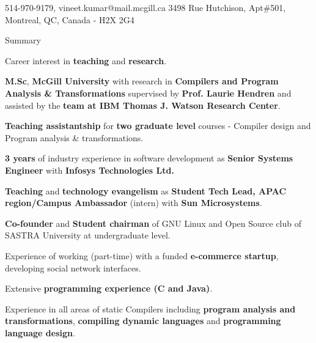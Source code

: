 \documentclass{resume} %
\begin{document}
\begin{hSubsection}{514-970-9179, vineet.kumar@mail.mcgill.ca}
{%
}{3498 Rue Hutchison, Apt\#501, Montreal, QC, Canada - H2X 2G4}
\end{hSubsection}



\begin{rSection}{Summary}
\smallskip
\begin{lSubsection}
 \item Career interest in \textbf{teaching} and \textbf{research}.
 \item \textbf{M.Sc}, \textbf{McGill University} with research in \textbf{Compilers and Program Analysis \& Transformations} supervised by \textbf{Prof. Laurie Hendren} and assisted by the \textbf{\xten team at IBM Thomas J. Watson Research Center}.
 \item \textbf {Teaching assistantship} for \textbf{two graduate level} courses - Compiler design and  Program analysis \& transformations.
 \item \textbf{3 years} of industry experience in software development as \textbf{Senior Systems Engineer} with \textbf{Infosys Technologies Ltd.}
 \item \textbf{Teaching} and \textbf{technology evangelism} as \textbf{Student Tech Lead, APAC region/Campus Ambassador} (intern) with \textbf{Sun Microsystems}.
 \item \textbf{Co-founder} and \textbf{Student chairman} of GNU Linux and Open Source club of SASTRA University at undergraduate level. 
 \item Experience of working (part-time) with a funded \textbf{e-commerce startup}, developing social network interfaces.
 \item Extensive \textbf{programming experience (C and Java)}.
 \item Experience in all areas of static Compilers including \textbf{program analysis and transformations}, \textbf{compiling dynamic languages} and \textbf{programming language design}.
 
\end{lSubsection}
\end{rSection}
\end{document}

